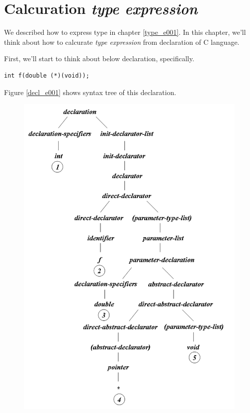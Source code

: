 \section{Calcuration {\em type expression}}
We described how to express type in chapter \ref{type_e001}.
In this chapter, we'll think about how to calcurate
{\em type expression} from declaration of C language.

First, we'll start to think about below declaration, specifically.
\begin{verbatim}
int f(double (*)(void));
\end{verbatim}
Figure \ref{decl_e001} shows syntax tree of this declaration.
\begin{figure}[htbp]
\begin{center}
\begin{htmlonly}
\includegraphics[width=1.0125\linewidth,height=1.4175\linewidth]{decl001.png}

\end{htmlonly}
\end{center}
\end{figure}
